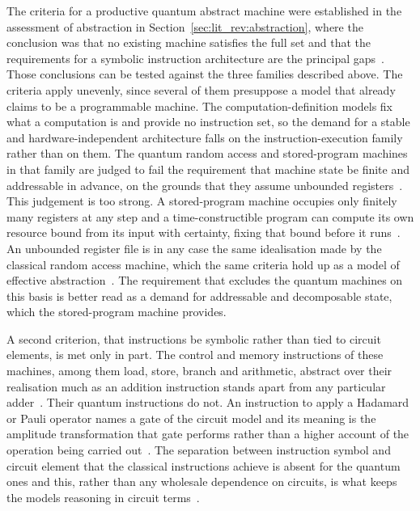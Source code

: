 The criteria for a productive quantum abstract machine were established in the assessment of abstraction in Section~\ref{sec:lit_rev:abstraction}, where the conclusion was that no existing machine satisfies the full set and that the requirements for a symbolic instruction architecture are the principal gaps~\cite{nunez_corrales2025betterabstractmachines}.
Those conclusions can be tested against the three families described above.
The criteria apply unevenly, since several of them presuppose a model that already claims to be a programmable machine.
The computation-definition models fix what a computation is and provide no instruction set, so the demand for a stable and hardware-independent architecture falls on the instruction-execution family rather than on them.
The quantum random access and stored-program machines in that family are judged to fail the requirement that machine state be finite and addressable in advance, on the grounds that they assume unbounded registers~\cite{nunez_corrales2025betterabstractmachines}.
This judgement is too strong.
A stored-program machine occupies only finitely many registers at any step and a time-constructible program can compute its own resource bound from its input with certainty, fixing that bound before it runs~\cite{wang2023qrasp}.
An unbounded register file is in any case the same idealisation made by the classical random access machine, which the same criteria hold up as a model of effective abstraction~\cite{nunez_corrales2025betterabstractmachines}.
The requirement that excludes the quantum machines on this basis is better read as a demand for addressable and decomposable state, which the stored-program machine provides.

A second criterion, that instructions be symbolic rather than tied to circuit elements, is met only in part.
The control and memory instructions of these machines, among them load, store, branch and arithmetic, abstract over their realisation much as an addition instruction stands apart from any particular adder~\cite{wang2023qrasp}.
Their quantum instructions do not.
An instruction to apply a Hadamard or Pauli operator names a gate of the circuit model and its meaning is the amplitude transformation that gate performs rather than a higher account of the operation being carried out~\cite{nunez_corrales2025betterabstractmachines}.
The separation between instruction symbol and circuit element that the classical instructions achieve is absent for the quantum ones and this, rather than any wholesale dependence on circuits, is what keeps the models reasoning in circuit terms~\cite{nunez_corrales2025betterabstractmachines}.

